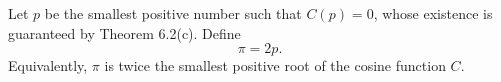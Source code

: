 Let $p$ be the smallest positive number such that $C(p) = 0$, whose existence is guaranteed by Theorem 6.2(c). Define
$$
\pi = 2p.
$$
Equivalently, $\pi$ is twice the smallest positive root of the cosine function $C$.
